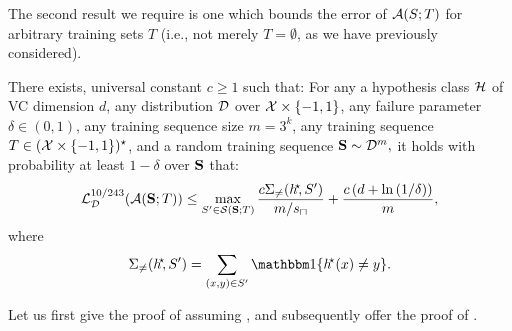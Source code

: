 The second result we require is one which bounds the error of $ \mathcal{A}(S;T)$ for arbitrary training sets $T$ (i.e., not merely $T = \emptyset$, as we have previously considered). 

\begin{theorem}\label{thm:upperbound}
    There exists, universal constant $ c\geq1 $ such that: For any a hypothesis class $\mathcal{H}$ of VC dimension $ d $, any distribution $ \mathcal{D} $ over $ \mathcal{X}\times\{  -1,1\}  $, any failure parameter $\delta \in (0, 1)$, any training sequence size $ m=3^{k} $, any training sequence $ T\in (\mathcal{X}\times\{-1,1  \})^{\star} $, and a random training sequence $ \mathbf{S}\sim\mathcal{D}^{m},$ it holds with probability at least $ 1-\delta $ over $ \mathbf{S} $ that:        
    \begin{align*}
        \operatorname{\mathcal{L}}_{\mathcal{D}}^{10/243}(\mathcal{A}(\mathbf{S};T))
        \leq  \max\limits_{S'\in\mathcal{S}(\mathbf{S};T)}\frac{c\Sigma_{\not=}(h^{\negmedspace\star}\negmedspace,S')}{m/s_{\sqcap}}+\frac{c\left(d+\ln{(1/\delta )}\right)}{m},
    \end{align*}
    where
    \[ \Sigma_{\not=}(\hs\negmedspace,S') =\sum\limits_{(x,y)\in S'} \ind\{ \hs(x)\not=y \}. \] 
\end{theorem}

Let us first give the proof of  assuming  , and subsequently offer the proof of . \\

